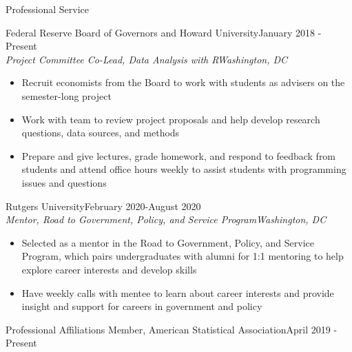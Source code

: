 \documentclass{resume} %
\begin{document}
\begin{rSection}{Professional Service }

{Federal Reserve Board of Governors and Howard University}\hfill {January 2018 - Present}\\
{\em Project Committee Co-Lead, Data Analysis with R}\hfill {\em Washington, DC}
\begin{itemize}[leftmargin=*, noitemsep, topsep=0pt]
\item Recruit economists from the Board to work with students as advisers on the semester-long project
\item Work with team to review project proposals and help develop research questions, data sources, and methods
\item Prepare and give lectures, grade homework, and respond to feedback from students and attend office hours weekly to assist students with programming issues and questions 
\end{itemize}

{Rutgers University}\hfill {February 2020-August 2020}\\
{\em Mentor, Road to Government, Policy, and Service Program}\hfill {\em Washington, DC}
\begin{itemize}[leftmargin=*, noitemsep, topsep=0pt]
\item Selected as a mentor in the Road to Government, Policy, and Service Program, which pairs undergraduates with alumni for 1:1 mentoring to help explore career interests and develop skills
\item Have weekly calls with mentee to learn about career interests and provide insight and support for careers in government and policy
\end{itemize}
\end{rSection}


\begin{rSection}{Professional Affiliations}
{Member, American Statistical Association}\hfill {April 2019 - Present}
\end{rSection}



\end{document}
